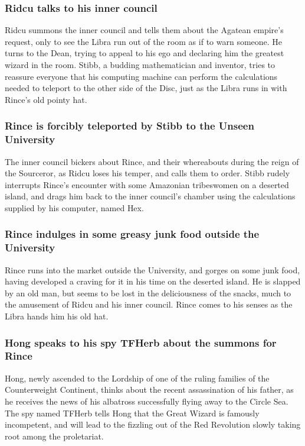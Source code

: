 \subsubsection{\Gls{Ridcu} talks to his inner council}
\Gls{Ridcu} summons the inner council and tells them about the Agatean empire's request, only to
see the \Gls{Libra} run out of the room as if to warn someone. He turns to the \Gls{Dean}, trying
to appeal to his ego and declaring him the greatest wizard in the room. \Gls{Stibb}, a budding
mathematician and inventor, tries to reassure everyone that his computing machine can perform the
calculations needed to teleport to the other side of the Disc, just as the \Gls{Libra} runs in with
\Gls{Rince}'s old pointy hat.

\subsubsection{\Gls{Rince} is forcibly teleported by \Gls{Stibb} to the Unseen University}
The inner council bickers about \Gls{Rince}, and their whereabouts during the reign of the
Sourceror, as \Gls{Ridcu} loses his temper, and calls them to order. \Gls{Stibb} rudely interrupts
\Gls{Rince}'s encounter with some Amazonian tribeswomen on a deserted island, and drags him back
to the inner council's chamber using the calculations supplied by his computer, named \Gls{Hex}.

\subsubsection{\Gls{Rince} indulges in some greasy junk food outside the University}
\Gls{Rince} runs into the market outside the University, and gorges on some junk food, having
developed a craving for it in his time on the deserted island. He is slapped by an old man, but
seems to be lost in the deliciousness of the snacks, much to the amusement of \Gls{Ridcu} and his
inner council. \Gls{Rince} comes to his senses as the \Gls{Libra} hands him his old hat.

\subsubsection{\Gls{Hong} speaks to his spy \Gls{TFHerb} about the summons for \Gls{Rince}}
\Gls{Hong}, newly ascended to the Lordship of one of the ruling families of the Counterweight
Continent, thinks about the recent assassination of his father, as he receives the news of his
albatross successfully flying away to the Circle Sea. The spy named \Gls{TFHerb} tells \Gls{Hong}
that the Great Wizard is famously incompetent, and will lead to the fizzling out of the Red
Revolution slowly taking root among the proletariat.

